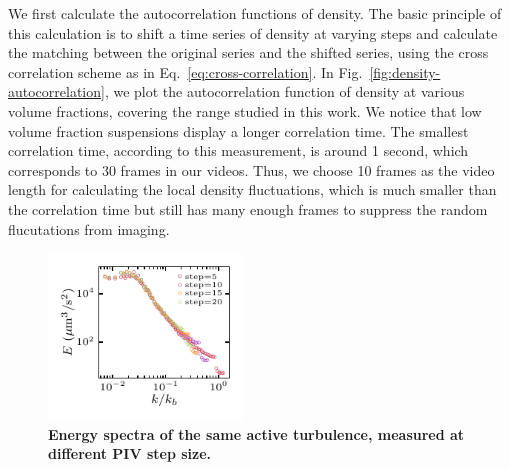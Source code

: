\documentclass[twocolumn,aps,prx,amsmath,amssymb,longbibliography]{revtex4-2}
\begin{document}
We first calculate the autocorrelation functions of density. The basic principle of this calculation is to shift a time series of density at varying steps and calculate the matching between the original series and the shifted series, using the cross correlation scheme as in Eq.~\ref{eq:cross-correlation}. In Fig.~\ref{fig:density-autocorrelation}, we plot the autocorrelation function of density at various volume fractions, covering the range studied in this work. We notice that low volume fraction suspensions display a longer correlation time. The smallest correlation time, according to this measurement, is around 1 second, which corresponds to 30 frames in our videos. Thus, we choose 10 frames as the video length for calculating the local density fluctuations, which is much smaller than the correlation time but still has many enough frames to suppress the random flucutations from imaging.



\begin{figure}[t]
\begin{center}
\includegraphics[width=0.46\textwidth]{Figures/kinks-in-energy-spectra/v1.pdf}
\caption[Density autocorrelation]
{
\textbf{Energy spectra of the same active turbulence, measured at different PIV step size.}
}
\label{fig:kink}
\end{center}
\end{figure}



\end{document}
